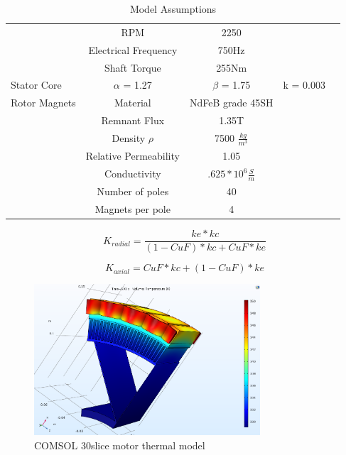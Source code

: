 \documentclass[]{aiaa-tc}%
\begin{document}
\begin{table}[hbt!]
\caption{\label{tab:COMSOL2} Model Assumptions}
\centering
\begin{tabular}{lcccc}
\\\hline
& RPM & 2250\\
& Electrical Frequency & 750Hz\\
& Shaft Torque & 255Nm \\\hline
Stator Core & $\alpha$ = 1.27 & $\beta$ = 1.75 & k = 0.003 \\\hline
Rotor Magnets  & Material   & NdFeB grade 45SH  \\
& Remnant Flux & 1.35T\\
& Density $\rho$ & 7500 $\frac{kg}{m^3}$ \\
& Relative Permeability & 1.05\\
& Conductivity & $.625*10^6 \frac{S}{m}$\\
& Number of poles & 40\\
& Magnets per pole & 4\\\hline
\end{tabular}
\end{table}

\begin{equation}
K_{radial} = \frac{ke*kc}{(1-CuF)*kc + CuF*ke}
\label{eq:kradial}
\end{equation}

\begin{equation}
K_{axial} = CuF*kc + (1-CuF)*ke
\label{eq:kaxial}
\end{equation}

\begin{figure}[!htb]%
	\centering
	\includegraphics[width=0.75\textwidth]{figures/jmx57_motor_comsol.png}
	\caption{COMSOL 30\degree slice motor thermal model}
	\label{fig:comsol}
\end{figure}
\end{document}
